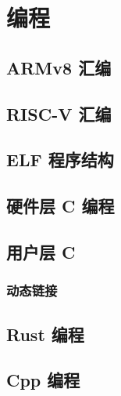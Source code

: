 \chapter{编程}

\section{ARMv8 汇编}

\section{RISC-V 汇编}

\section{ELF 程序结构}

\section{硬件层 C 编程}

\section{用户层 C}
\subsection{动态链接}

\section{Rust 编程}

\section{Cpp 编程}
